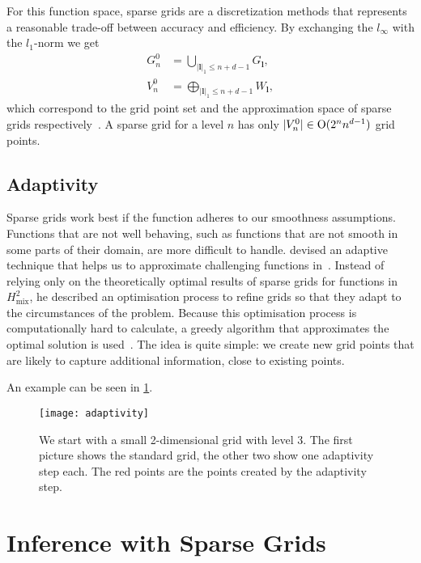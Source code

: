 For this function space, sparse grids are a discretization methods that
represents a reasonable trade-off between accuracy and efficiency.
By exchanging the \(l_\infty\) with the \(l_1\)-norm we get
\begin{align}
  G_n^0 &= \bigcup_{\vert {\bm{l}} \vert_1 \leq n + d - 1} G_{\bm{l}}, \nonumber \\
  V_n^0 &= \bigoplus_{\vert {\bm{l}} \vert_1 \leq n + d - 1} W_{\bm{l}} \label{eq:sparse-grid-space},
\end{align}
which correspond to the grid point set and the approximation space of sparse
grids respectively~\cite{bungartzSparse}.
A sparse grid for a level \(n\) has only \(\vert V_n^0 \vert \in \operatorname{O} (2^n
n^{d-1})\) grid points.

\subsection{Adaptivity}
Sparse grids work best if the function adheres to our smoothness assumptions.
Functions that are not well behaving, such as functions that are not smooth in
some parts of their domain, are more difficult to handle.
\citeauthor{spatAdaptGrid} devised an adaptive technique that helps us to approximate challenging functions in~\cite{spatAdaptGrid}.
Instead of relying only on the theoretically optimal results of sparse grids for
functions in \(H^2_{\text{mix}}\), he described an optimisation process to
refine grids so that they adapt to the circumstances of the problem.
Because this optimisation process is computationally hard to calculate, a greedy
algorithm that approximates the optimal solution is used~\cite{spatAdaptGrid}.
The idea is quite simple: we create new grid points that are likely to capture
additional information, close to existing points.

An example can be seen in \cref{fig:adaptivity}.

\begin{figure}[thb]
\centering
\texttt{[image: adaptivity]}
 \caption[Adaptivity]{We start with a small 2-dimensional grid with level 3. The first
   picture shows the standard grid, the other two show one adaptivity step each.
 The red points are the points created by the adaptivity step.}\label{fig:adaptivity}
\end{figure}

\section{Inference with Sparse Grids}

